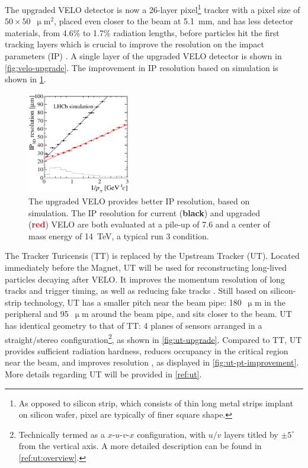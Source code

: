 The upgraded VELO detector is now a 26-layer pixel\footnote{
    As opposed to silicon strip, which consists of thin long metal strips
    implant on silicon wafer,
    pixel are typically of finer square shape.
} tracker with a pixel size of $50 \times 50$~$\upmu$m$^2$,
placed even closer to the beam at 5.1~mm,
and has less detector materials, from 4.6\% to 1.7\% radiation lengths, before
particles hit the first tracking layers which is crucial to improve the
resolution on the impact parameters (IP) \cite{Hennessy_2017}.
A single layer of the upgraded VELO detector is shown in
\cref{fig:velo-upgrade}.
The improvement in IP resolution based on simulation is shown in
\cref{fig:velo-ip-improvement}.

\begin{figure}[!htb]
    \centering
    \includegraphics[width=0.4\textwidth]{./figs-lhcb-upgrade-overview/tracking/velo_ip_improvement.pdf}
    \caption{
        The upgraded VELO provides better IP resolution, based on simulation.
        The IP resolution for current (\textbf{black}) and upgraded
        (\textcolor{red}{\textbf{red}})
        VELO are both evaluated at a
        pile-up of 7.6 and a center of mass energy of 14~TeV, a typical run 3
        condition.
    }
    \label{fig:velo-ip-improvement}
\end{figure}

The Tracker Turicensis (TT) is replaced by the Upstream Tracker (UT).
Located immediately before the Magnet,
UT will be used for reconstructing long-lived particles decaying after VELO.
It improves the momentum resolution of long tracks and trigger timing,
as well as reducing fake tracks
\cite{Piucci_2017,Wang:2015mem}.
Still based on silicon-strip technology, UT has a smaller pitch near the beam
pipe:
180~$\upmu$m in the peripheral and 95~$\upmu$m around the beam pipe,
and sits closer to the beam.
UT has identical geometry to that of TT:
4 planes of sensors arranged in a straight/stereo configuration\footnote{
    Technically termed as a $x$-$u$-$v$-$x$ configuration, with
    $u/v$ layers titled by $\pm 5^\circ$ from the vertical axis.
    A more detailed description can be found in \cref{ref:ut:overview}.
},
as shown in \cref{fig:ut-upgrade}.
Compared to TT, UT provides sufficient radiation hardness,
reduces occupancy in the critical region near the beam, and improves
\pt resolution \cite{LHCB-TDR-015},
as displayed in \cref{fig:ut-pt-improvement}.
More details regarding UT will be provided in \cref{ref:ut}.


